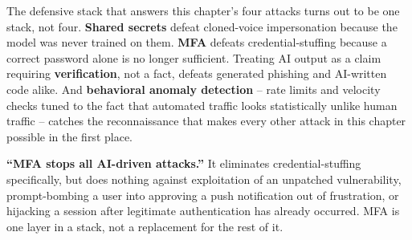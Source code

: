 The defensive stack that answers this chapter's four attacks turns out to be one stack, not four.
\textbf{Shared secrets} defeat cloned-voice impersonation because the model was never trained on
them. \textbf{MFA} defeats credential-stuffing because a correct password alone is no longer
sufficient. Treating AI output as a claim requiring \textbf{verification}, not a fact, defeats
generated phishing and AI-written code alike. And \textbf{behavioral anomaly detection} -- rate
limits and velocity checks tuned to the fact that automated traffic looks statistically unlike
human traffic -- catches the reconnaissance that makes every other attack in this chapter
possible in the first place.

\begin{misconception}
\textbf{``MFA stops all AI-driven attacks.''} It eliminates credential-stuffing specifically, but
does nothing against exploitation of an unpatched vulnerability, prompt-bombing a user into
approving a push notification out of frustration, or hijacking a session after legitimate
authentication has already occurred. MFA is one layer in a stack, not a replacement for the rest
of it.
\end{misconception}

